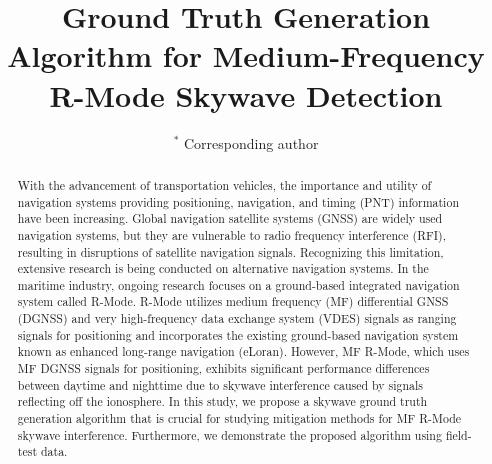 \documentclass[conference]{IEEEtran}
\begin{document}
\title{Ground Truth Generation Algorithm for Medium-Frequency R-Mode Skywave Detection}

\author{ 
\and
{} 
{\small${}^{*}$ Corresponding author}
}

\maketitle

\begin{abstract}
With the advancement of transportation vehicles, the importance and utility of navigation systems providing positioning, navigation, and timing (PNT) information have been increasing. 
Global navigation satellite systems (GNSS) are widely used navigation systems, but they are vulnerable to radio frequency interference (RFI), resulting in disruptions of satellite navigation signals. 
Recognizing this limitation, extensive research is being conducted on alternative navigation systems. 
In the maritime industry, ongoing research focuses on a ground-based integrated navigation system called R-Mode. 
R-Mode utilizes medium frequency (MF) differential GNSS (DGNSS) and very high-frequency data exchange system (VDES) signals as ranging signals for positioning and incorporates the existing ground-based navigation system known as enhanced long-range navigation (eLoran). 
However, MF R-Mode, which uses MF DGNSS signals for positioning, exhibits significant performance differences between daytime and nighttime due to skywave interference caused by signals reflecting off the ionosphere. 
In this study, we propose a skywave ground truth generation algorithm that is crucial for studying mitigation methods for MF R-Mode skywave interference. 
Furthermore, we demonstrate the proposed algorithm using field-test data.
\end{abstract}
\end{document}
